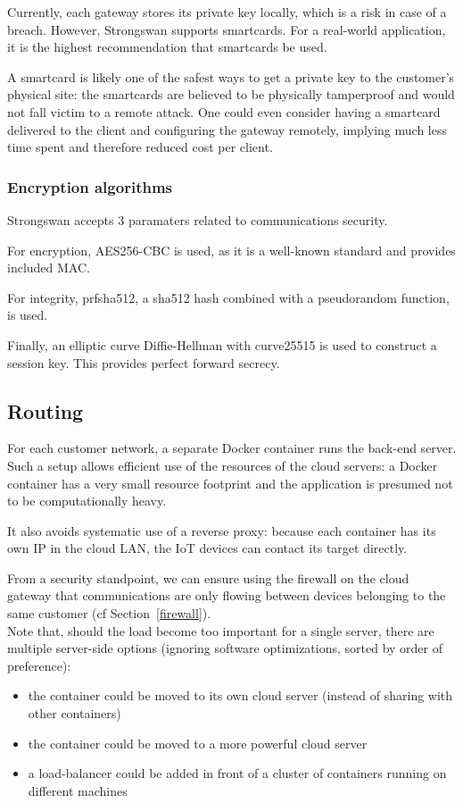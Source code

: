 \documentclass[paper=a4, fontsize=11pt]{scrartcl}
\begin{document}
Currently, each gateway stores its private key locally, which is a risk in case
of a breach.
However, Strongswan supports smartcards.
For a real-world application, it is the highest recommendation that smartcards
be used.

A smartcard is likely one of the safest ways to get a private key
to the customer's physical site: the smartcards are believed to be physically
tamperproof and would not fall victim to a remote attack.
One could even consider having a smartcard delivered to the client and
configuring the gateway remotely, implying much less time spent and therefore
reduced cost per client.

\subsubsection{Encryption algorithms}

Strongswan accepts 3 paramaters related to communications security.

For encryption, AES256-CBC is used, as it is a well-known standard and provides
included MAC\@.

For integrity, prfsha512, a sha512 hash combined with a pseudorandom
function, is used.

Finally, an elliptic curve Diffie-Hellman with curve25515 is used to
construct a session key.
This provides perfect forward secrecy.

\subsection{Routing}

For each customer network, a separate Docker container runs the back-end server.
Such a setup allows efficient use of the resources of the cloud servers: a
Docker container has a very small resource footprint and the application is
presumed not to be computationally heavy.

It also avoids systematic use of a reverse proxy: because each container has its
own IP in the cloud LAN, the IoT devices can contact its target directly.

From a security standpoint, we can ensure using the firewall on the cloud
gateway that communications are only flowing between devices belonging to
the same customer (cf Section~\ref{firewall}).
\\

Note that, should the load become too important for a single server, there are
multiple server-side options (ignoring software optimizations, sorted by order of
preference):
\begin{itemize}
    \item the container could be moved to its own cloud server (instead of
    sharing with other containers)
    \item the container could be moved to a more powerful cloud server
    \item a load-balancer could be added in front of a cluster of containers
        running on different machines
\end{itemize}
\end{document}
